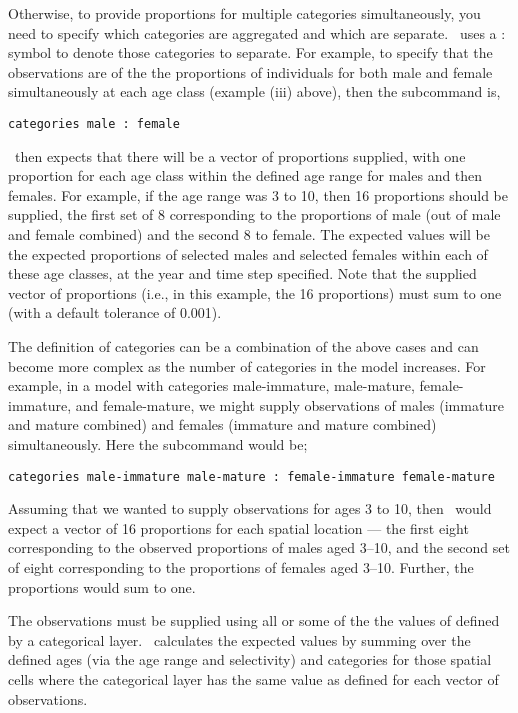 Otherwise, to provide proportions for multiple categories simultaneously, you need to specify which categories are aggregated and which are separate. \SPM\ uses a $:$ symbol to denote those categories to separate. For example, to specify that the observations are of the the proportions of individuals for both male and female simultaneously at each age class (example (iii) above), then the subcommand  is,

\begin{verbatim}
categories male : female
\end{verbatim}

\SPM\ then expects that there will be a vector of proportions supplied, with one proportion for each age class within the defined age range for males and then females. For example, if the age range was 3 to 10, then 16 proportions should be supplied, the first set of 8 corresponding to the proportions of male (out of male and female combined) and the second 8 to female. The expected values will be the expected proportions of selected males and selected females within each of these age classes, at the year and time step specified. Note that the supplied vector of proportions (i.e., in this example, the 16 proportions) must sum to one (with a default tolerance of 0.001).

The definition of categories can be a combination of the above cases and can become more complex as the number of categories in the model increases. For example, in a model with categories male-immature, male-mature, female-immature, and female-mature, we might supply observations of males (immature and mature combined) and females (immature and mature combined) simultaneously. Here the  subcommand would be;

\begin{verbatim}
categories male-immature male-mature : female-immature female-mature
\end{verbatim}

Assuming that we wanted to supply observations for ages 3 to 10, then \SPM\ would expect a vector of 16 proportions for each spatial location --- the first eight corresponding to the observed proportions of males aged 3--10, and the second set of eight corresponding to the proportions of females aged 3--10. Further, the proportions would sum to one.

The observations must be supplied using all or some of the the values of defined by a categorical layer. \SPM\ calculates the expected values by summing over the defined ages (via the age range and selectivity) and categories for those spatial cells where the categorical layer has the same value as defined for each vector of observations.

